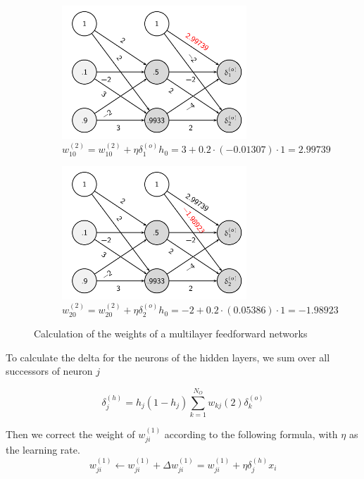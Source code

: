 \documentclass[11pt]{article}
\begin{document}
\begin{figure}[tbh!]
    \begin{subfigure}{0.45\linewidth}
        \centering
        \includegraphics[keepaspectratio, height=5cm]{Pictures/multilayer_backward_propagation_example_03}
        \caption{$w_{10}^{(2)} = w_{10}^{(2)} + \eta \delta_1^{(o)} h_0 = 3 + 0.2\cdot (-0.01307)\cdot 1 = 2.99739$}
    \end{subfigure}
    \begin{subfigure}{0.45\linewidth}
        \centering
        \includegraphics[keepaspectratio, height=5cm]{Pictures/multilayer_backward_propagation_example_04}
        \caption{$w_{20}^{(2)} = w_{20}^{(2)} + \eta \delta_2^{(o)} h_0 = -2 + 0.2\cdot (0.05386)\cdot 1 = -1.98923$}
    \end{subfigure}
    \caption{Calculation of the weights of a multilayer feedforward networks}
    \label{fig:backwardpropagationnetworks}
\end{figure}

\noindent
To calculate the delta for the neurons of the hidden layers, we sum over all successors of neuron $j$

\begin{equation}
    \delta_j^{(h)} = h_j (1 - h_j) \sum_{k=1}^{N_O} w_{kj}{(2)} \delta_k^{(o)}
\end{equation}

\noindent
Then we correct the weight of $w_{ji}^{(1)}$ according to the following formula, with $\eta$ as the learning rate.
\begin{equation}
    w_{ji}^{(1)} \leftarrow w_{ji}^{(1)} + \Delta w_{ji}^{(1)} = w_{ji}^{(1)} + \eta\delta_j^{(h)} x_i
\end{equation}
\end{document}
